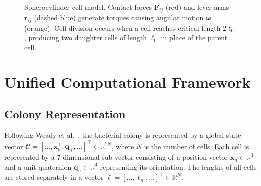 \documentclass[conference]{IEEEtran}
\begin{document}
\begin{figure}[H]
    \caption{Spherocylinder cell model. Contact forces $\mathbf{F}_{ij}$ (red) and lever arms $\mathbf{r}_{ij}$ (dashed blue) generate torques causing angular motion $\boldsymbol{\omega}$ (orange). Cell division occurs when a cell reaches critical length $2\ell_0$, producing two daughter cells of length $\ell_0$ in place of the parent cell.}
    \label{fig:spherocylinder_model}

\end{figure}

\newpage

\section{Unified Computational Framework}

\subsection{Colony Representation}

Following Weady et al.~\cite{Weady2024SM}, the bacterial colony is represented by a global state vector $\mathbfcal{C} = [\dots, \mathbf{x}_n^\top, \mathbf{q}_n^\top, \dots]^\top \in \mathbb{R}^{7N}$, where $N$ is the number of cells. Each cell is represented by a 7-dimensional sub-vector consisting of a position vector $\mathbf{x}_n \in \mathbb{R}^3$ and a unit quaternion $\mathbf{q}_n \in \mathbb{R}^4$ representing its orientation. The lengths of all cells are stored separately in a vector $\boldsymbol{\ell} = [\dots, \ell_n, \dots]^\top \in \mathbb{R}^{N}$.
\end{document}
